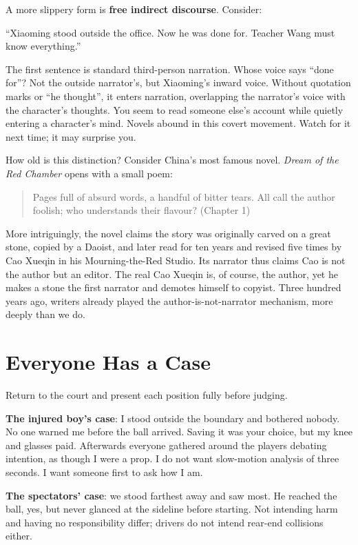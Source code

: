 A more slippery form is \textbf{free indirect discourse}. Consider:

``Xiaoming stood outside the office. Now he was done for. Teacher Wang must know everything.''

The first sentence is standard third-person narration. Whose voice says ``done for''? Not the outside narrator's, but Xiaoming's inward voice. Without quotation marks or ``he thought'', it enters narration, overlapping the narrator's voice with the character's thoughts. You seem to read someone else's account while quietly entering a character's mind. Novels abound in this covert movement. Watch for it next time; it may surprise you.

How old is this distinction? Consider China's most famous novel. \emph{Dream of the Red Chamber} opens with a small poem:

\begin{quote}
Pages full of absurd words, a handful of bitter tears. All call the author foolish; who understands their flavour? (Chapter 1)
\end{quote}
More intriguingly, the novel claims the story was originally carved on a great stone, copied by a Daoist, and later read for ten years and revised five times by Cao Xueqin in his Mourning-the-Red Studio. Its narrator thus claims Cao is not the author but an editor. The real Cao Xueqin is, of course, the author, yet he makes a stone the first narrator and demotes himself to copyist. Three hundred years ago, writers already played the author-is-not-narrator mechanism, more deeply than we do.

\section{Everyone Has a Case}
Return to the court and present each position fully before judging.

\textbf{The injured boy's case}: I stood outside the boundary and bothered nobody. No one warned me before the ball arrived. Saving it was your choice, but my knee and glasses paid. Afterwards everyone gathered around the players debating intention, as though I were a prop. I do not want slow-motion analysis of three seconds. I want someone first to ask how I am.

\textbf{The spectators' case}: we stood farthest away and saw most. He reached the ball, yes, but never glanced at the sideline before starting. Not intending harm and having no responsibility differ; drivers do not intend rear-end collisions either.


